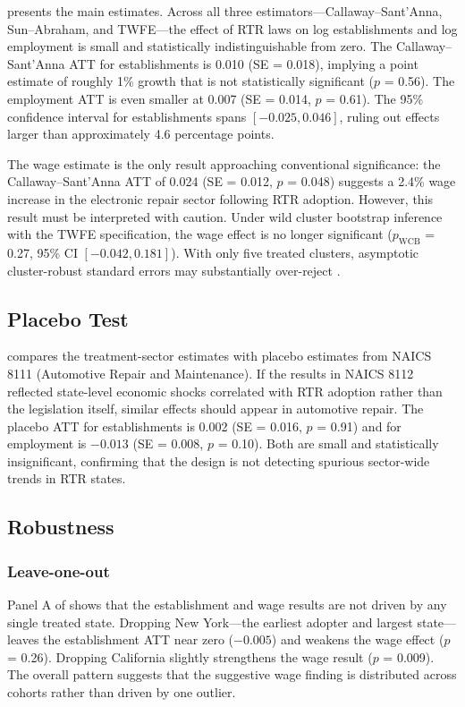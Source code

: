 \documentclass[12pt]{article}
\begin{document}
 presents the main estimates. Across all three estimators---Callaway--Sant'Anna, Sun--Abraham, and TWFE---the effect of RTR laws on log establishments and log employment is small and statistically indistinguishable from zero. The Callaway--Sant'Anna ATT for establishments is 0.010 (SE = 0.018), implying a point estimate of roughly 1\% growth that is not statistically significant ($p$ = 0.56). The employment ATT is even smaller at 0.007 (SE = 0.014, $p$ = 0.61). The 95\% confidence interval for establishments spans $[-0.025, 0.046]$, ruling out effects larger than approximately 4.6 percentage points.

The wage estimate is the only result approaching conventional significance: the Callaway--Sant'Anna ATT of 0.024 (SE = 0.012, $p$ = 0.048) suggests a 2.4\% wage increase in the electronic repair sector following RTR adoption. However, this result must be interpreted with caution. Under wild cluster bootstrap inference with the TWFE specification, the wage effect is no longer significant ($p_{\text{WCB}}$ = 0.27, 95\% CI $[-0.042, 0.181]$). With only five treated clusters, asymptotic cluster-robust standard errors may substantially over-reject \citep{mackinnon2022cluster}.

\subsection{Placebo Test}



 compares the treatment-sector estimates with placebo estimates from NAICS 8111 (Automotive Repair and Maintenance). If the results in NAICS 8112 reflected state-level economic shocks correlated with RTR adoption rather than the legislation itself, similar effects should appear in automotive repair. The placebo ATT for establishments is 0.002 (SE = 0.016, $p$ = 0.91) and for employment is $-0.013$ (SE = 0.008, $p$ = 0.10). Both are small and statistically insignificant, confirming that the design is not detecting spurious sector-wide trends in RTR states.

\subsection{Robustness}



\subsubsection*{Leave-one-out} Panel A of  shows that the establishment and wage results are not driven by any single treated state. Dropping New York---the earliest adopter and largest state---leaves the establishment ATT near zero ($-0.005$) and weakens the wage effect ($p$ = 0.26). Dropping California slightly strengthens the wage result ($p$ = 0.009). The overall pattern suggests that the suggestive wage finding is distributed across cohorts rather than driven by one outlier.
\end{document}
